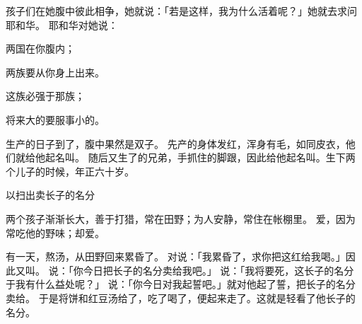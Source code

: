 {孩子们在她腹中彼此相争，她就说：「若是这样，我为什么活着呢？」她就去求问耶和华。
耶和华对她说：
\par }{\Q 两国在你腹内；
\par }{\Q 两族要从你身上出来。
\par }{\Q 这族必强于那族；
\par }{\Q 将来大的要服事小的。
\par }{\PP {}生产的日子到了，腹中果然是双子。
先产的身体发红，浑身有毛，如同皮衣，他们就给他起名叫{}。
随后又生了{}的兄弟，手抓住{}的脚跟，因此给他起名叫{}。{}生下两个儿子的时候，{}年正六十岁。
\par }{\SH 以扫出卖长子的名分
\par }{\PP {}两个孩子渐渐长大，{}善于打猎，常在田野；{}为人安静，常住在帐棚里。
爱{}，因为常吃他的野味；{}却爱{}。
\par }{\PP {}有一天，{}熬汤，{}从田野回来累昏了。
对{}说：「我累昏了，求你把这红{}给我喝。」因此{}又叫{}。
说：「你今日把长子的名分卖给我吧。」
说：「我将要死，这长子的名分于我有什么益处呢？」
说：「你今日对我起誓吧。」{}就对他起了誓，把长子的名分卖给{}。
于是{}将饼和红豆汤给了{}，{}吃了喝了，便起来走了。这就是{}轻看了他长子的名分。

}
